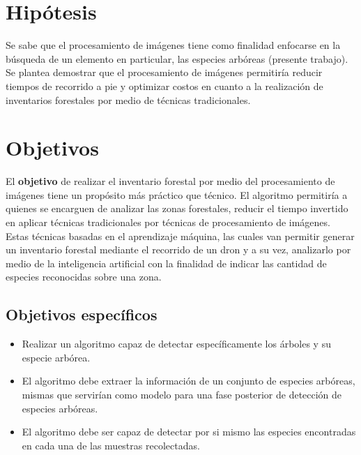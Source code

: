 \documentclass[a0,portrait]{a0poster}
\begin{document}
\begin{multicols}{2}
\section*{Hipótesis}
Se sabe que el procesamiento de imágenes tiene como finalidad enfocarse en la búsqueda de un elemento en particular, las especies arbóreas (presente trabajo). Se plantea demostrar que el procesamiento de imágenes permitiría reducir tiempos de recorrido a pie y optimizar costos en cuanto a la realización de inventarios forestales por medio de técnicas tradicionales.


\section*{Objetivos}
El \textbf{objetivo} de realizar el inventario forestal por medio del procesamiento de
imágenes tiene un propósito más práctico que técnico. El algoritmo permitiría a quienes se encarguen de analizar las zonas forestales, reducir el tiempo invertido en aplicar técnicas tradicionales por técnicas de procesamiento de imágenes.\\

Estas técnicas  basadas en el aprendizaje máquina, las cuales van permitir
generar un inventario forestal mediante el recorrido de un dron y a su vez, analizarlo por medio de la inteligencia artificial con la finalidad de indicar las cantidad de especies reconocidas sobre una zona.
\subsection*{Objetivos específicos}
\begin{itemize}
\item Realizar un algoritmo capaz de detectar específicamente los árboles y su especie arbórea.
\end{itemize}

\begin{itemize}
\item El algoritmo debe extraer la información de un conjunto de especies arbóreas, mismas que servirían como modelo para una fase posterior de detección de especies arbóreas.
\end{itemize}

\begin{itemize}
\item El algoritmo debe ser capaz de detectar por si mismo las especies encontradas en cada una de las muestras recolectadas.
\end{itemize}


\end{multicols}
\end{document}
